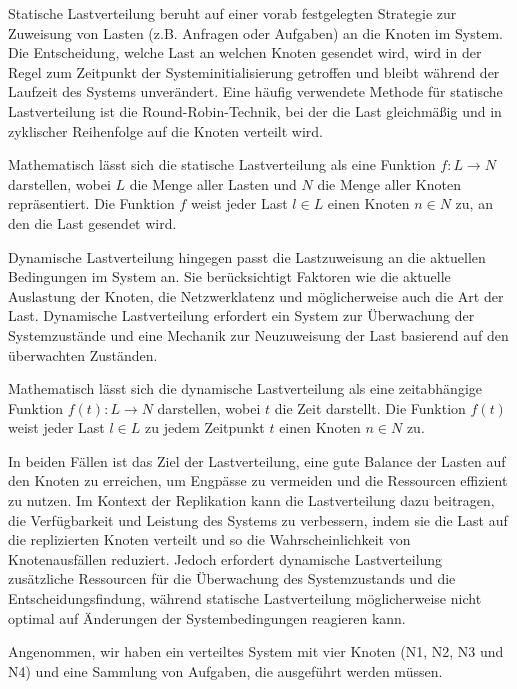 Statische Lastverteilung beruht auf einer vorab festgelegten Strategie zur Zuweisung von Lasten (z.B. Anfragen oder Aufgaben) an die Knoten im System. Die Entscheidung, welche Last an welchen Knoten gesendet wird, wird in der Regel zum Zeitpunkt der Systeminitialisierung getroffen und bleibt während der Laufzeit des Systems unverändert. Eine häufig verwendete Methode für statische Lastverteilung ist die Round-Robin-Technik, bei der die Last gleichmäßig und in zyklischer Reihenfolge auf die Knoten verteilt wird.

Mathematisch lässt sich die statische Lastverteilung als eine Funktion $f: L \to N$ darstellen, wobei $L$ die Menge aller Lasten und $N$ die Menge aller Knoten repräsentiert. Die Funktion $f$ weist jeder Last $l \in L$ einen Knoten $n \in N$ zu, an den die Last gesendet wird.

Dynamische Lastverteilung hingegen passt die Lastzuweisung an die aktuellen Bedingungen im System an. Sie berücksichtigt Faktoren wie die aktuelle Auslastung der Knoten, die Netzwerklatenz und möglicherweise auch die Art der Last. Dynamische Lastverteilung erfordert ein System zur Überwachung der Systemzustände und eine Mechanik zur Neuzuweisung der Last basierend auf den überwachten Zuständen.

Mathematisch lässt sich die dynamische Lastverteilung als eine zeitabhängige Funktion $f(t): L \to N$ darstellen, wobei $t$ die Zeit darstellt. Die Funktion $f(t)$ weist jeder Last $l \in L$ zu jedem Zeitpunkt $t$ einen Knoten $n \in N$ zu.

In beiden Fällen ist das Ziel der Lastverteilung, eine gute Balance der Lasten auf den Knoten zu erreichen, um Engpässe zu vermeiden und die Ressourcen effizient zu nutzen. Im Kontext der Replikation kann die Lastverteilung dazu beitragen, die Verfügbarkeit und Leistung des Systems zu verbessern, indem sie die Last auf die replizierten Knoten verteilt und so die Wahrscheinlichkeit von Knotenausfällen reduziert. Jedoch erfordert dynamische Lastverteilung zusätzliche Ressourcen für die Überwachung des Systemzustands und die Entscheidungsfindung, während statische Lastverteilung möglicherweise nicht optimal auf Änderungen der Systembedingungen reagieren kann.

Angenommen, wir haben ein verteiltes System mit vier Knoten (N1, N2, N3 und N4) und eine Sammlung von Aufgaben, die ausgeführt werden müssen.

